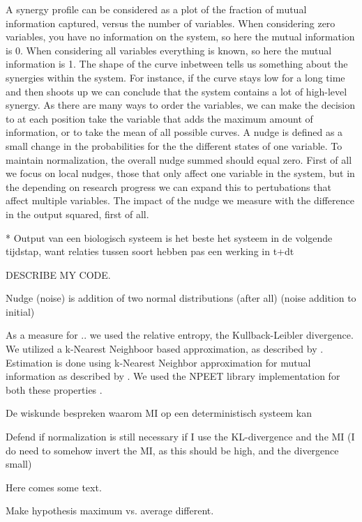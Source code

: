 \documentclass[../main.tex]{subfiles}
\begin{document}
A synergy profile can be considered as a plot of the fraction of mutual information captured, versus the number of variables. 
When considering zero variables, you have no information on the system, so here the mutual information is 0.
When considering all variables everything is known, so here the mutual information is
1. 
The shape of the curve inbetween tells us something about the synergies within the system.
For instance, if the curve stays low for a long time and then shoots up we can conclude that the system contains a lot of high-level synergy. As there are many ways to order the variables, we can make the decision to at each position take the variable that adds the maximum amount of information, or to take the mean of all possible curves.
A nudge is defined as a small change in the probabilities for the the different states of one variable. To maintain normalization, the overall nudge summed should equal zero.
First of all we focus on local nudges, those that only affect one variable in the system, but in the depending on research progress we can expand this to pertubations that affect multiple variables. 
The impact of the nudge we measure with the difference in the output squared, first of all.

* Output van een biologisch systeem is het beste het systeem in de volgende tijdstap, want relaties tussen soort hebben pas een werking in t+dt

DESCRIBE MY CODE.

Nudge (noise) is addition of two normal distributions (after all) (noise addition to initial)

As a measure for .. we used the relative entropy, the Kullback-Leibler divergence.
We utilized a k-Nearest Neighboor based approximation, as described by \citep{wang2009divergence}.
Estimation is done using k-Nearest Neighbor approximation for mutual information as described by \citep{kraskov2004estimating}.
We used the NPEET library implementation for both these properties \cite{versteeg2013NPEET}.

De wiskunde bespreken waarom MI op een deterministisch systeem kan

Defend if normalization is still necessary if I use the KL-divergence and the MI (I do need to somehow invert the MI, as this should be high, and the divergence small)

Here comes some text.

Make hypothesis maximum vs. average different.
\end{document}
